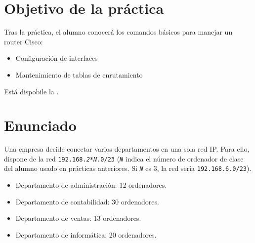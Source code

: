 
\usepackage{eurosym}
\usepackage{needspace}


\renewcommand{\hmwkTitle}{Práctica enrutamiento IP}
\renewcommand{\hmwkClass}{Planificación y Administración de Redes}

\usepackage{blindtext}






\primerapagina

\setlength{\parindent}{1em}
\setlength{\parskip}{1em}

\section{Objetivo de la práctica}
Tras la práctica, el alumno conocerá los comandos básicos para manejar un router Cisco:
\begin{itemize}
\item Configuración de interfaces
\item Mantenimiento de tablas de enrutamiento
\end{itemize}

Está dispobile la .

\section{Enunciado}
Una empresa decide conectar varios departamentos en una sola red IP. Para ello, dispone de la red \texttt{192.168.\textit{2*N}.0/23} (\texttt{\textit{N}} indica el número de ordenador de clase del alumno usado en prácticas anteriores. Si \texttt{\textit{N}} es 3, la red sería \texttt{192.168.6.0/23}).
\begin{itemize}
\item Departamento de administración: 12 ordenadores. %
\item Departamento de contabilidad: 30 ordenadores. %
\item Departamento de ventas: 13 ordenadores.     %
\item Departamento de informática: 20 ordenadores.%
\end{itemize}

